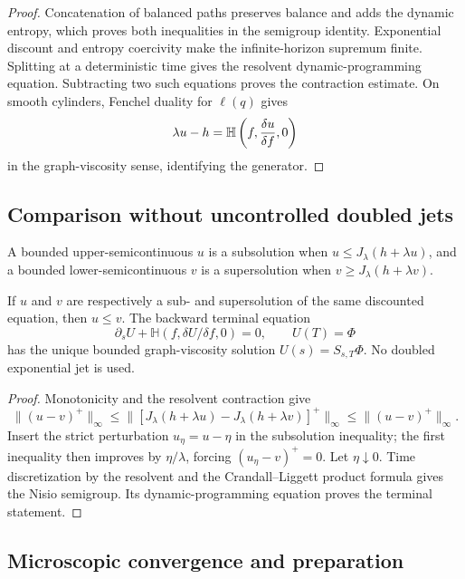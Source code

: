 \begin{proof}
Concatenation of balanced paths preserves balance and adds the dynamic
entropy, which proves both inequalities in the semigroup identity.
Exponential discount and entropy coercivity make the infinite-horizon
supremum finite.  Splitting at a deterministic time gives the resolvent
dynamic-programming equation.  Subtracting two such equations proves the
contraction estimate.  On smooth cylinders, Fenchel duality for
\(\ell(q)\) gives
\[
 \lambda u-h
 =
 \mathbb H\left(f,{\delta u\over\delta f},0\right)
\]
in the graph-viscosity sense, identifying the generator.
\end{proof}

\subsection{Comparison without uncontrolled doubled jets}

A bounded upper-semicontinuous \(u\) is a subsolution when
\(u\le J_\lambda(h+\lambda u)\), and a bounded lower-semicontinuous \(v\) is
a supersolution when \(v\ge J_\lambda(h+\lambda v)\).

\begin{theorem}
\label{thm:r14-b4-comparison}
If \(u\) and \(v\) are respectively a sub- and supersolution of the same
discounted equation, then \(u\le v\).  The backward terminal equation
\[
 \partial_sU+\mathbb H(f,\delta U/\delta f,0)=0,\qquad U(T)=\Phi
\]
has the unique bounded graph-viscosity solution \(U(s)=S_{s,T}\Phi\).
No doubled exponential jet is used.
\end{theorem}

\begin{proof}
Monotonicity and the resolvent contraction give
\[
 \|(u-v)^+\|_\infty
 \le
 \|[J_\lambda(h+\lambda u)-J_\lambda(h+\lambda v)]^+\|_\infty
 \le\|(u-v)^+\|_\infty .
\]
Insert the strict perturbation \(u_\eta=u-\eta\) in the subsolution
inequality; the first inequality then improves by \(\eta/\lambda\), forcing
\((u_\eta-v)^+=0\).  Let \(\eta\downarrow0\).
Time discretization by the resolvent and the Crandall--Liggett product
formula gives the Nisio semigroup.  Its dynamic-programming equation proves
the terminal statement.
\end{proof}

\subsection{Microscopic convergence and preparation}


